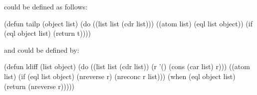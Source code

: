 
 could be defined as follows:

\code
 (defun tailp (object list)
   (do ((list list (cdr list)))
       ((atom list) (eql list object))
      (if (eql object list)
          (return t))))
\endcode

and  could be defined by:

\code
(defun ldiff (list object)
  (do ((list list (cdr list))
       (r '() (cons (car list) r)))
      ((atom list)
       (if (eql list object) (nreverse r) (nreconc r list)))
    (when (eql object list)
      (return (nreverse r)))))
\endcode

%
%


\endcom

